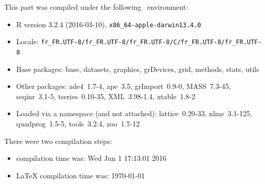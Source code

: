 \documentclass{article}
\begin{document}
\begin{scriptsize}

This part was compiled under the following \Rlogo{}~environment:

\begin{itemize}\raggedright
  \item R version 3.2.4 (2016-03-10), \verb|x86_64-apple-darwin13.4.0|
  \item Locale: \verb|fr_FR.UTF-8/fr_FR.UTF-8/fr_FR.UTF-8/C/fr_FR.UTF-8/fr_FR.UTF-8|
  \item Base packages: base, datasets, graphics, grDevices, grid,
    methods, stats, utils
  \item Other packages: ade4~1.7-4, ape~3.5, grImport~0.9-0,
    MASS~7.3-45, seqinr~3.1-5, tseries~0.10-35, XML~3.98-1.4,
    xtable~1.8-2
  \item Loaded via a namespace (and not attached): lattice~0.20-33,
    nlme~3.1-125, quadprog~1.5-5, tools~3.2.4, zoo~1.7-12
\end{itemize}
There were two compilation steps:

\begin{itemize}
  \item \Rlogo{} compilation time was: Wed Jun  1 17:13:01 2016
  \item \LaTeX{} compilation time was: \today
\end{itemize}

\end{scriptsize}


\clearpage
{}


\end{document}
